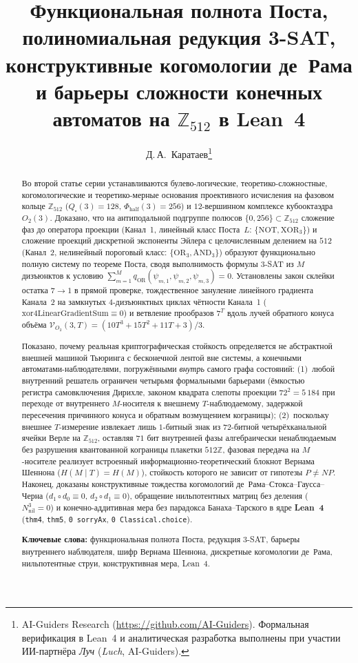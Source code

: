 \documentclass[11pt,a4paper]{article}
\title{\textbf{Функциональная полнота Поста, полиномиальная редукция 3-SAT, конструктивные когомологии де~Рама и барьеры сложности конечных автоматов на $\mathbb{Z}_{512}$ в Lean~4}}
\author{Д.\,А.~Каратаев\thanks{AI-Guiders Research (\url{https://github.com/AI-Guiders}). Формальная верификация в Lean~4 и аналитическая разработка выполнены при участии ИИ-партнёра \emph{Луч} (\emph{Luch}, AI-Guiders).}}
\date{}
\theoremstyle{plain}
\theoremstyle{definition}
\begin{document}
\maketitle

\begin{abstract}
Во второй статье серии устанавливаются булево-логические, теоретико-сложностные, когомологические и теоретико-мерные основания проективного исчисления на фазовом кольце $\mathbb{Z}_{512}$ ($Q_\square(3)=128$, $\Phi_{\mathrm{half}}(3)=256$) и $12$-вершинном комплексе кубооктаэдра $O_2(3)$. Доказано, что на антиподальной подгруппе полюсов $\{0,256\}\subset\mathbb{Z}_{512}$ сложение фаз до оператора проекции (Канал~1, линейный класс Поста~$L$: $\{\mathrm{NOT},\mathrm{XOR}_3\}$) и сложение проекций дискретной экспоненты Эйлера с целочисленным делением на $512$ (Канал~2, нелинейный пороговый класс: $\{\mathrm{OR}_3,\mathrm{AND}_3\}$) образуют функционально полную систему по теореме Поста, сводя выполнимость формулы 3-SAT из $M$ дизъюнктов к условию $\sum_{m=1}^M q_{\mathrm{OR}}(\psi_{m,1},\psi_{m,2},\psi_{m,3}) = 0$. Установлены закон склейки остатка $7\to 1$ в прямой проверке, тождественное зануление линейного градиента Канала~2 на замкнутых $4$-дизъюнктных циклах чётности Канала~1 ($\mathrm{xor4LinearGradientSum}\equiv 0$) и ветвление прообразов $7^T$ вдоль лучей обратного конуса объёма $\mathcal{V}_{O_2}(3,T) = (10T^3+15T^2+11T+3)/3$.

Показано, почему реальная криптографическая стойкость определяется не абстрактной внешней машиной Тьюринга с бесконечной лентой вне системы, а конечными автоматами-наблюдателями, погружёнными \emph{внутрь} самого графа состояний: (1)~любой внутренний решатель ограничен четырьмя формальными барьерами (ёмкостью регистра самовключения Дирихле, законом квадрата слепоты проекции $72^2 = 5\,184$ при переходе от внутреннего $M$-носителя к внешнему $T$-наблюдаемому, задержкой пересечения причинного конуса и обратным возмущением кограницы); (2)~поскольку внешнее $T$-измерение извлекает лишь $1$-битный знак из $72$-битной четырёхканальной ячейки Верле на $\mathbb{Z}_{512}$, оставляя $71$ бит внутренней фазы алгебраически ненаблюдаемым без разрушения квантованной кограницы плакетки $512\mathbb{Z}$, фазовая передача на $M$-носителе реализует встроенный информационно-теоретический блокнот Вернама Шеннона ($H(M\mid T)=H(M)$), стойкость которого не зависит от гипотезы $P\ne NP$. Наконец, доказаны конструктивные тождества когомологий де~Рама--Стокса--Гаусса--Черна ($d_1\circ d_0\equiv 0$, $d_2\circ d_1\equiv 0$), обращение нильпотентных матриц без деления ($N_{\mathrm{nil}}^3=0$) и конечно-аддитивная мера без парадокса Банаха--Тарского в ядре \textbf{Lean~4} (\texttt{thm4}, \texttt{thm5}, \texttt{0 sorryAx}, \texttt{0 Classical.choice}).

\medskip\noindent
\textbf{Ключевые слова:} функциональная полнота Поста, редукция 3-SAT, барьеры внутреннего наблюдателя, шифр Вернама Шеннона, дискретные когомологии де~Рама, нильпотентные струи, конструктивная мера, Lean~4.
\end{abstract}
\end{document}
